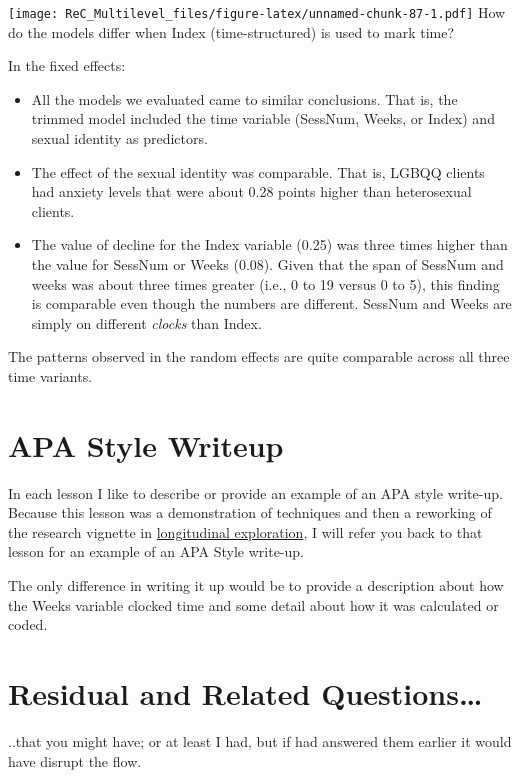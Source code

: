 \documentclass[
  english,
]{book}
\providecommand{\tightlist}{%
  \setlength{\itemsep}{0pt}\setlength{\parskip}{0pt}}
\begin{document}
\texttt{[image: ReC\_Multilevel\_files/figure-latex/unnamed-chunk-87-1.pdf]}
How do the models differ when Index (time-structured) is used to mark time?

In the fixed effects:

\begin{itemize}
\tightlist
\item
  All the models we evaluated came to similar conclusions. That is, the trimmed model included the time variable (SessNum, Weeks, or Index) and sexual identity as predictors.
\item
  The effect of the sexual identity was comparable. That is, LGBQQ clients had anxiety levels that were about 0.28 points higher than heterosexual clients.
\item
  The value of decline for the Index variable (0.25) was three times higher than the value for SessNum or Weeks (0.08). Given that the span of SessNum and weeks was about three times greater (i.e., 0 to 19 versus 0 to 5), this finding is comparable even though the numbers are different. SessNum and Weeks are simply on different \emph{clocks} than Index.
\end{itemize}

The patterns observed in the random effects are quite comparable across all three time variants.

\hypertarget{apa-style-writeup-3}{%
\section{APA Style Writeup}\label{apa-style-writeup-3}}

In each lesson I like to describe or provide an example of an APA style write-up. Because this lesson was a demonstration of techniques and then a reworking of the research vignette in \href{MLMexplore}{longitudinal exploration}, I will refer you back to that lesson for an example of an APA Style write-up.

The only difference in writing it up would be to provide a description about how the Weeks variable clocked time and some detail about how it was calculated or coded.

\hypertarget{residual-and-related-questions-3}{%
\section{Residual and Related Questions\ldots{}}\label{residual-and-related-questions-3}}

..that you might have; or at least I had, but if had answered them earlier it would have disrupt the flow.
\end{document}
